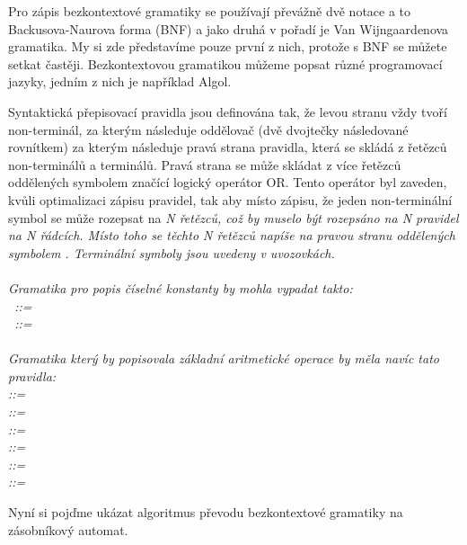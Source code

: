 Pro zápis bezkontextové gramatiky se používají převážně dvě notace a to Backusova-Naurova forma (BNF) a jako druhá v pořadí je Van Wijngaardenova gramatika. My si zde představíme pouze první z nich, protože s BNF se můžete setkat častěji. Bezkontextovou gramatikou můžeme popsat různé programovací jazyky, jedním z nich je například Algol. \cite{CFG}

Syntaktická přepisovací pravidla jsou definována tak, že levou stranu vždy tvoří non-terminál, za kterým následuje oddělovač \uv{::=} (dvě dvojtečky následované rovnítkem) za kterým následuje pravá strana pravidla, která se skládá z řetězců non-terminálů a terminálů. Pravá strana se může skládat z více řetězců oddělených symbolem \uv{\textbar} značící logický operátor OR. Tento operátor byl zaveden, kvůli optimalizaci zápisu pravidel, tak aby místo zápisu, že jeden non-terminální symbol se může rozepsat na \it{N} řetězců, což by muselo být rozepsáno na \it{N} pravidel na \it{N} řádcích. Místo toho se těchto \it{N} řetězců napíše na pravou stranu oddělených symbolem \uv{\textbar}. Terminální symboly jsou uvedeny v uvozovkách.
\cite{BCF}
\\
\\
Gramatika pro popis číselné konstanty by mohla vypadat takto:\\
~::= ~\textbar~  \\
~::=~~\textbar~~\textbar~~\textbar~~\textbar~~
\textbar~~\textbar~~\textbar~~\textbar~~\textbar~ \\
\\
Gramatika který by popisovala základní aritmetické operace by měla navíc tato pravidla:\\
 ::=  \uv{+}  \\
 ::=  \uv{-}  \\
 ::=  \uv{\(\times\)}  \\
 ::=  \uv{/}  \\
 ::= \uv{(}  \uv{)} \\
 ::= \\


Nyní si pojďme ukázat algoritmus převodu bezkontextové gramatiky na zásobníkový automat. \cite{CFG_to_PDA}

